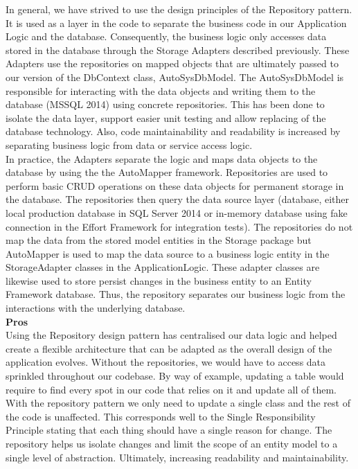 In general, we have strived to use the design principles of the Repository pattern. It is used as a layer in the code to separate the business code in our Application Logic and the database. Consequently, the business logic only accesses data stored in the database through the Storage Adapters described previously. These Adapters use the repositories on mapped objects that are ultimately passed to our version of the DbContext class, AutoSysDbModel. The AutoSysDbModel is responsible for interacting with the data objects and writing them to the database (MSSQL 2014) using concrete repositories. This has been done to isolate the data layer, support easier unit testing and allow replacing of the database technology. Also, code maintainability and readability is increased by
separating business logic from data or service access logic. \\

\noindent
In practice, the Adapters separate the logic and maps data objects to the database by using the the AutoMapper framework. Repositories are used to perform basic CRUD operations on these data objects for permanent storage in the database. The repositories then query the data source layer (database, either local production database in SQL Server 2014 or in-memory database using fake connection in the Effort Framework for integration tests). The repositories do not map the
data from the stored model entities in the Storage package but AutoMapper is used to map the data source to a business logic entity in the StorageAdapter classes in the ApplicationLogic. These adapter classes are likewise used to store persist changes in the business entity to an Entity Framework database. Thus, the repository separates our business logic from the interactions with the
underlying database.\\

\textbf{Pros}\\
Using the Repository design pattern has centralised our data logic and helped
create a flexible architecture that can be adapted as the overall design of
the application evolves. Without the repositories, we would have to access data
sprinkled throughout our codebase. By way of example, updating a table would
require to find every spot in our code that relies on it and update all of them.
With the repository pattern we only need to update a single class and the rest
of the code is unaffected. This corresponds well to the Single Responsibility
Principle stating that each thing should have a single reason for change. The
repository helps us isolate changes and limit the scope of an entity model to a
single level of abstraction. Ultimately, increasing readability and maintainability.\\

